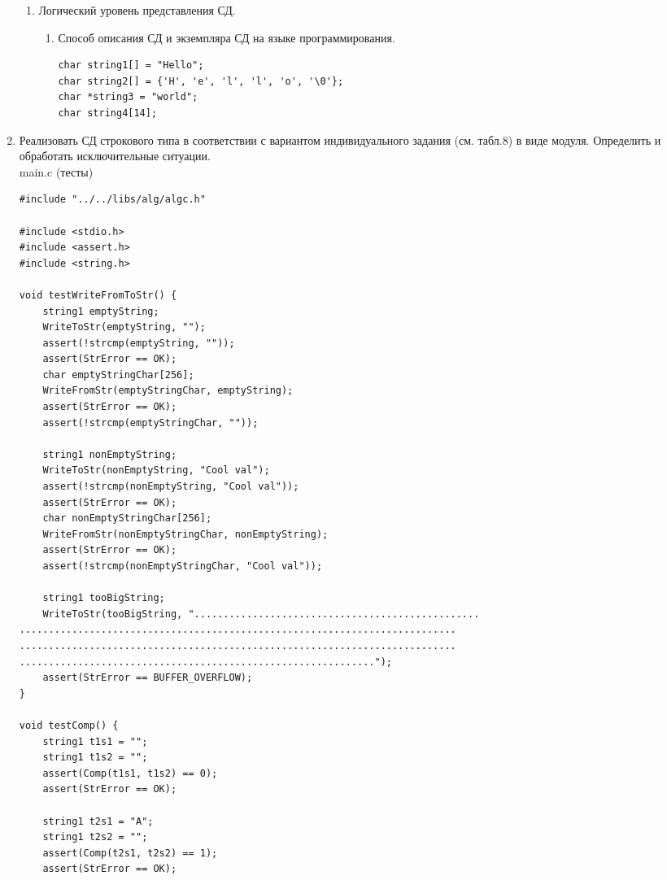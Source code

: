 \documentclass[a4paper,14pt]{extarticle}
\begin{document}
\begin{enumerate}
\begin{enumerate}[label*=\arabic*.]
		      \item Логический уровень представления СД.
		            \begin{enumerate}[label*=\arabic*.]
			            \item Способ описания СД и экземпляра СД на языке программирования.\\
						\begin{verbatim}
char string1[] = "Hello";
char string2[] = {'H', 'e', 'l', 'l', 'o', '\0'};
char *string3 = "world";
char string4[14];
												  \end{verbatim}
		            \end{enumerate}
	      \end{enumerate}
		  \item Реализовать СД строкового типа в соответствии с вариантом индивидуального
		  задания (см. табл.8) в виде модуля. Определить и обработать 
		  исключительные ситуации.\\
main.c (тесты)
		  \begin{verbatim}
#include "../../libs/alg/algc.h"

#include <stdio.h>
#include <assert.h>
#include <string.h>

void testWriteFromToStr() {
    string1 emptyString;
    WriteToStr(emptyString, "");
    assert(!strcmp(emptyString, ""));
    assert(StrError == OK);
    char emptyStringChar[256];
    WriteFromStr(emptyStringChar, emptyString);
    assert(StrError == OK);
    assert(!strcmp(emptyStringChar, ""));

    string1 nonEmptyString;
    WriteToStr(nonEmptyString, "Cool val");
    assert(!strcmp(nonEmptyString, "Cool val"));
    assert(StrError == OK);
    char nonEmptyStringChar[256];
    WriteFromStr(nonEmptyStringChar, nonEmptyString);
    assert(StrError == OK);
    assert(!strcmp(nonEmptyStringChar, "Cool val"));

    string1 tooBigString;
    WriteToStr(tooBigString, ".................................................
...........................................................................
...........................................................................
.............................................................");
    assert(StrError == BUFFER_OVERFLOW);
}

void testComp() {
    string1 t1s1 = "";
    string1 t1s2 = "";
    assert(Comp(t1s1, t1s2) == 0);
    assert(StrError == OK);

    string1 t2s1 = "A";
    string1 t2s2 = "";
    assert(Comp(t2s1, t2s2) == 1);
    assert(StrError == OK);


\end{verbatim}
\end{enumerate}
\end{document}
